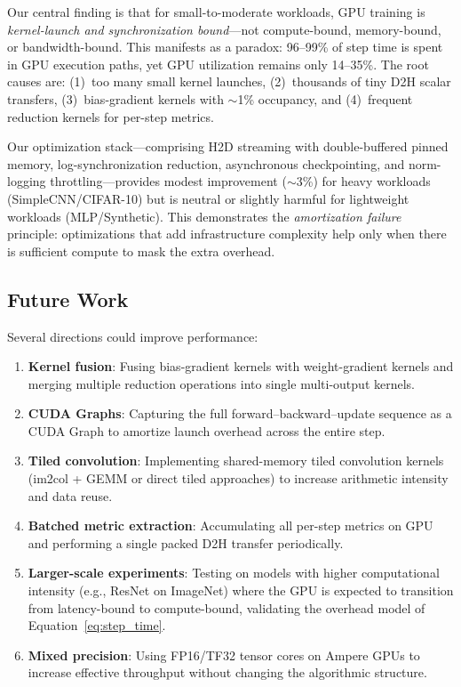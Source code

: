 \documentclass[10pt,twocolumn,letterpaper]{article}
\begin{document}
Our central finding is that for small-to-moderate workloads, GPU training is \emph{kernel-launch and synchronization bound}---not compute-bound, memory-bound, or bandwidth-bound.
This manifests as a paradox: 96--99\% of step time is spent in GPU execution paths, yet GPU utilization remains only 14--35\%.
The root causes are: (1)~too many small kernel launches, (2)~thousands of tiny D2H scalar transfers, (3)~bias-gradient kernels with $\sim$1\% occupancy, and (4)~frequent reduction kernels for per-step metrics.

Our optimization stack---comprising H2D streaming with double-buffered pinned memory, log-synchronization reduction, asynchronous checkpointing, and norm-logging throttling---provides modest improvement ($\sim$3\%) for heavy workloads (SimpleCNN/CIFAR-10) but is neutral or slightly harmful for lightweight workloads (MLP/Synthetic).
This demonstrates the \emph{amortization failure} principle: optimizations that add infrastructure complexity help only when there is sufficient compute to mask the extra overhead.

\subsection{Future Work}

Several directions could improve performance:
\begin{enumerate}[nosep,leftmargin=*]
  \item \textbf{Kernel fusion}: Fusing bias-gradient kernels with weight-gradient kernels and merging multiple reduction operations into single multi-output kernels.
  \item \textbf{CUDA Graphs}: Capturing the full forward--backward--update sequence as a CUDA Graph to amortize launch overhead across the entire step.
  \item \textbf{Tiled convolution}: Implementing shared-memory tiled convolution kernels (im2col + GEMM or direct tiled approaches) to increase arithmetic intensity and data reuse.
  \item \textbf{Batched metric extraction}: Accumulating all per-step metrics on GPU and performing a single packed D2H transfer periodically.
  \item \textbf{Larger-scale experiments}: Testing on models with higher computational intensity (e.g., ResNet on ImageNet) where the GPU is expected to transition from latency-bound to compute-bound, validating the overhead model of Equation~\ref{eq:step_time}.
  \item \textbf{Mixed precision}: Using FP16/TF32 tensor cores on Ampere GPUs to increase effective throughput without changing the algorithmic structure.
\end{enumerate}
\end{document}
